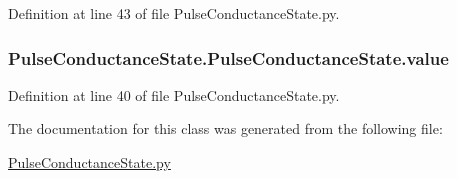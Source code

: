 Definition at line 43 of file Pulse\-Conductance\-State.\-py.

\hypertarget{class_pulse_conductance_state_1_1_pulse_conductance_state_a832cdff7f315b8c16bef00642fb385dd}{
\subsubsection[{value}]{\setlength{\rightskip}{0pt plus 5cm}Pulse\-Conductance\-State.\-Pulse\-Conductance\-State.\-value}}\label{class_pulse_conductance_state_1_1_pulse_conductance_state_a832cdff7f315b8c16bef00642fb385dd}


Definition at line 40 of file Pulse\-Conductance\-State.\-py.



The documentation for this class was generated from the following file\-:\begin{DoxyCompactItemize}
\item 
\hyperlink{_pulse_conductance_state_8py}{Pulse\-Conductance\-State.\-py}\end{DoxyCompactItemize}
